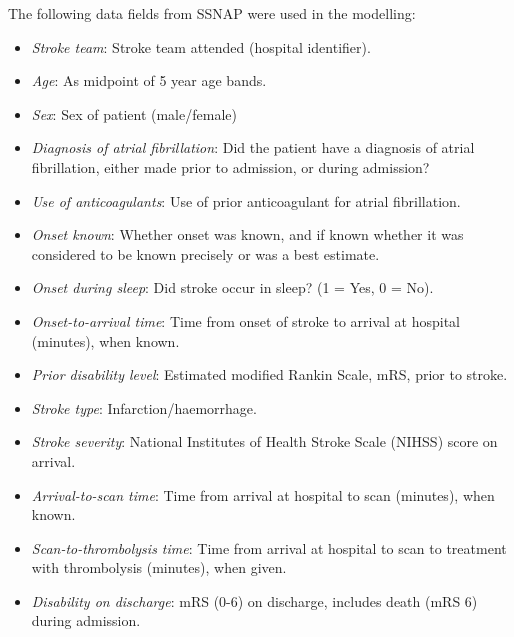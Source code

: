 The following data fields from SSNAP were used in the modelling:

\begin{itemize}

    \item \textit{Stroke team}: Stroke team attended (hospital identifier).

    \item \textit{Age}: As midpoint of 5 year age bands.

    \item \textit{Sex}: Sex of patient (male/female)

    \item \textit{Diagnosis of atrial fibrillation}: Did the patient have a diagnosis of atrial fibrillation, either made prior to admission, or during admission?

    \item \textit{Use of anticoagulants}: Use of prior anticoagulant for atrial fibrillation.

    \item \textit{Onset known}: Whether onset was known, and if known whether it was considered to be known precisely or was a best estimate.

    \item \textit{Onset during sleep}: Did stroke occur in sleep? (1 = Yes, 0 = No).

    \item \textit{Onset-to-arrival time}: Time from onset of stroke to arrival at hospital (minutes), when known.

    \item \textit{Prior disability level}: Estimated modified Rankin Scale, mRS, prior to stroke.

    \item \textit{Stroke type}: Infarction/haemorrhage.

    \item \textit{Stroke severity}: National Institutes of Health Stroke Scale (NIHSS) score on arrival.

    \item \textit{Arrival-to-scan time}: Time from arrival at hospital to scan (minutes), when known.

    \item \textit{Scan-to-thrombolysis time}: Time from arrival at hospital to scan to treatment with thrombolysis  (minutes), when given.

    \item \textit{Disability on discharge}: mRS (0-6) on discharge, includes death (mRS 6) during admission.
    
\end{itemize}


